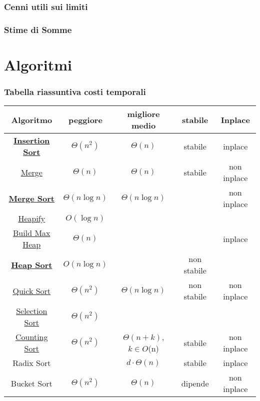 \documentclass{article}
\begin{document}
\section{Cenni utili sui limiti}

\section{Stime di Somme}
\newpage
\part{Algoritmi}
\section{Tabella riassuntiva costi temporali} %
\begin{tabular}{|c|c|c|c|c|}
    \hline
    \textbf{Algoritmo} & \textbf{peggiore} & \textbf{ migliore medio} & \textbf{stabile } & \textbf{Inplace}\\
    \hline
    \hyperlink{insertionsort}{\textbf{Insertion Sort}} & $\Theta(n^2)$ & $\Theta(n)$ & stabile & inplace\\
    \hyperlink{merge}{Merge} & $\Theta(n)$ & $\Theta(n)$ & stabile & non inplace\\
    \hyperlink{mergesort}{\textbf{Merge Sort}}& $\Theta(n \log n)$ & $\Theta(n \log n)$ & & non inplace\\
    \hyperlink{heapify}{Heapify} & $O(\log n)$ & & & \\
    \hyperlink{buildmaxheap}{Build Max Heap} & $\Theta(n)$ & & & inplace \\ 
    \hyperlink{heapsort}{\textbf{Heap Sort}} & $O(n \log n)$ & & non stabile & \\
    \hyperlink{quicksort}{Quick Sort} & $\Theta(n^2)$ & $\Theta(n \log n)$ & non stabile &non inplace \\
    \hyperlink{selection}{Selection Sort} & $\Theta(n^2)$ & & & \\
    \hyperlink{countingsort}{Counting Sort} & $\Theta(n^2)$  & $\Theta(n+k)$, $k \in O$(n) & stabile & non inplace\\    
    Radix Sort &  & $d \cdot \Theta(n)$ & stabile & inplace \\
    Bucket Sort & $\Theta(n^2)$ & $\Theta(n)$ & dipende & non inplace\\
    \hline

\end{tabular}
\newpage
\end{document}
